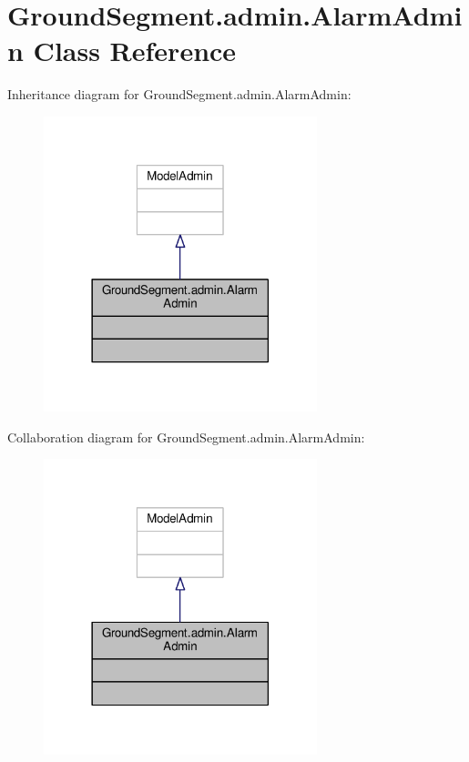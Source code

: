 \hypertarget{class_ground_segment_1_1admin_1_1_alarm_admin}{}\section{Ground\+Segment.\+admin.\+Alarm\+Admin Class Reference}
\label{class_ground_segment_1_1admin_1_1_alarm_admin}


Inheritance diagram for Ground\+Segment.\+admin.\+Alarm\+Admin\+:\nopagebreak
\begin{figure}[H]
\begin{center}
\leavevmode
\includegraphics[width=225pt]{class_ground_segment_1_1admin_1_1_alarm_admin__inherit__graph}
\end{center}
\end{figure}


Collaboration diagram for Ground\+Segment.\+admin.\+Alarm\+Admin\+:\nopagebreak
\begin{figure}[H]
\begin{center}
\leavevmode
\includegraphics[width=225pt]{class_ground_segment_1_1admin_1_1_alarm_admin__coll__graph}
\end{center}
\end{figure}


